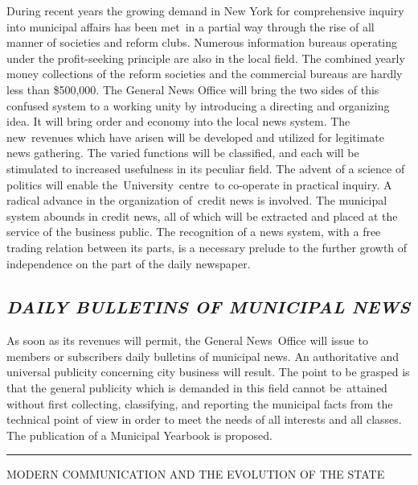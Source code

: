 \documentclass[openany,nobib]{tufte-book}
\begin{document}
During recent years the growing demand in New York for comprehensive
inquiry into municipal affairs has been met~in a partial way through the
rise of all manner of societies and reform clubs. Numerous information
bureaus operating under the profit-seeking principle are also in the
local field. The combined yearly money collections of the reform
societies and the commercial bureaus are hardly less than \$500,000. The
General News Office will bring the two sides of this confused system to
a working unity by introducing a directing and organizing idea. It will
bring order and economy into the local news system. The new~revenues
which have arisen will be developed and utilized for legitimate news
gathering. The varied functions will be classified, and each will be
stimulated to increased usefulness in its peculiar field. The advent of
a science of politics will enable the~University~centre~to co-operate in
practical inquiry. A radical advance in the organization of~credit news
is involved. The municipal system abounds in credit news, all of which
will be extracted and placed at the service of the business public. The
recognition of a news system, with a free trading relation between its
parts, is a necessary prelude to the further growth of independence on
the part of the daily newspaper.~

\hypertarget{daily-bulletins-of-municipal-news}{%
\subsection{\emph{DAILY BULLETINS OF MUNICIPAL
NEWS}}\label{daily-bulletins-of-municipal-news}}

As soon as its revenues will permit, the General News~Office will issue
to members or subscribers daily bulletins of municipal news. An
authoritative and universal publicity concerning city business will
result. The point to be grasped is that the general publicity which is
demanded in this field cannot be~attained without first collecting,
classifying, and reporting the municipal facts from the technical point
of view in order to meet the needs of all interests and all classes. The
publication of a Municipal Yearbook is proposed.~

\begin{center}
    \vspace{0.2in}
    \noindent\rule{2in}{0.5pt}
    \vspace{0.2in}
\end{center}


\begin{center}

\begin{spacing}{1.25}
    

{\LARGE MODERN COMMUNICATION AND THE EVOLUTION OF THE
STATE}

\end{spacing}

\end{center}
\end{document}
